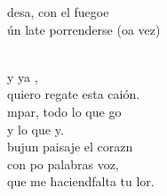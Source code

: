 \documentclass[12pt]{article}
\begin{document}
\begin{multicols*}{2}
\begin{cancion}
\begin{chorus}
	desa, con el fuegoe \\
	ún late porrenderse (oa vez)\\
	\end{chorus}%
	\jump\\
	y ya , \\
	quiero regate esta caión.\\
	mpar, todo lo que go \\
	y lo que y.\\
	bujun paisaje  el corazn\\
	con po palabras  voz,\\
	que me haciendfalta tu lor.\\
\end{cancion}%


\end{multicols*}
\end{document}
